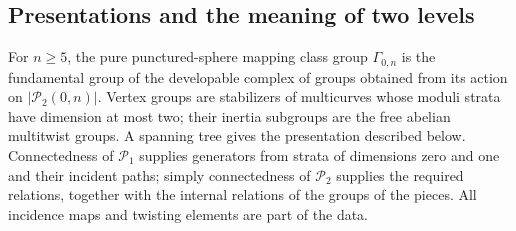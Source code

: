 \subsection{Presentations and the meaning of two levels}

\begin{theorem}\label{P5c1}
For $n\ge5$, the pure punctured-sphere mapping class group
$\Gamma_{0,n}$ is the fundamental group of the developable
complex of groups obtained from its action on
$|\mathcal P_2(0,n)|$.  Vertex groups are stabilizers of
multicurves whose moduli strata have dimension at most two;
their inertia subgroups are the free abelian multitwist groups.
A spanning tree gives the presentation described below.
Connectedness of $\mathcal P_1$ supplies generators from
strata of dimensions zero and one and their incident paths;
simply connectedness of $\mathcal P_2$ supplies the required
relations, together with the internal relations of the groups
of the pieces.  All incidence maps and twisting elements are
part of the data.
\end{theorem}
